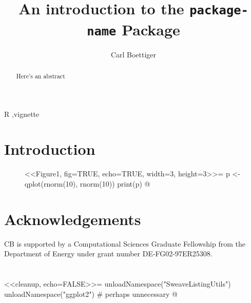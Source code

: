 \documentclass{elsarticle}
\begin{document}
\begin{frontmatter}
  \title{An introduction to the \texttt{package-name} Package}
  \author[davis]{Carl Boettiger}
  \address[davis]{Center for Population Biology, University of California, Davis, United States}

  \begin{abstract}
  Here's an abstract
  \end{abstract}

  \begin{keyword}
   R  \sep vignette
   \end{keyword}
 \end{frontmatter}

\section{Introduction}

\begin{figure}
<<Figure1, fig=TRUE, echo=TRUE, width=3, height=3>>=
p <- qplot(rnorm(10), rnorm(10))
print(p)
@
\end{figure}

 \section{Acknowledgements}
 CB is supported by a Computational Sciences Graduate Fellowship from the Department of Energy under grant number DE-FG02-97ER25308. 
 \section*{ }%
 


<<cleanup, echo=FALSE>>=
unloadNamespace("SweaveListingUtils")
unloadNamespace("ggplot2") # perhaps unnecessary
@
\end{document}

